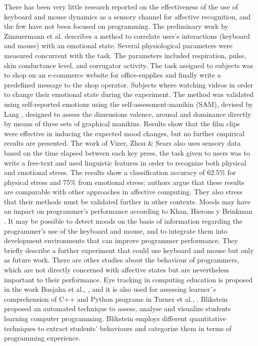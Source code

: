 \documentclass[conference]{IEEEtran}
\begin{document}
There has been very little research reported on the effectiveness of the use of
keyboard and mouse dynamics as a sensory channel for affective recognition, and
the few have not been focused on programming. The preliminary work by Zimmermann
et al. \cite{zimmermann2003affective} describes a method to correlate user’s interactions (keyboard and
mouse) with an emotional state. Several physiological parameters were measured
concurrent with the task. The parameters included respiration, pulse, skin
conductance level, and corrugator activity. The task assigned to subjects was to
shop on an e-commerce website for office-supplies and finally write a predefined
message to the shop operator. Subjects where watching videos in order to change
their emotional state during the experiment. The method was validated using
self-reported emotions using the self-assessment-manikin (SAM), devised by Lang
\cite{lang1980behavioral}, designed to assess the dimensions valence, arousal and dominance
directly by means of three sets of graphical manikins. Results show that the
film clips were effective in inducing the expected mood changes, but no further
empirical results are presented. The work of Vizer, Zhou \& Sears \cite{vizer2009automated} also
uses sensory data based on the time elapsed between each key press, the task
given to users was to write a free-text and used linguistic features in order to
recognize both physical and emotional stress. The results show a classification
accuracy of 62.5\% for physical stress and 75\% from emotional stress; authors
argue that these results are comparable with other approaches in affective
computing. They also stress that their methods must be validated further in
other contexts. Moods may have an impact on programmer’s performance according
to Khan, Hierons y Brinkman \cite{khan2007mood}. It may be possible to detect moods
on the basis of information regarding the programmer’s use of the keyboard and
mouse, and to integrate them into development environments that can improve
programmer performance. They briefly describe a further experiment that could
use keyboard and mouse but only as future work. There are other studies about
the behaviour of programmers, which are not directly concerned with affective
states but are nevertheless important to their performance. Eye tracking in
computing education is proposed in the work Busjahn et al., \cite{busjahn2014eye}, and it is
also used for assessing learner´s comprehension of C++ and Python programs in
Turner et al., \cite{turner2014eye}. Blikstein \cite{blikstein2011using} proposed 
an automated technique to
assess, analyse and visualize students learning computer programming. Blikstein
employs different quantitative techniques to extract students’ behaviours and
categorize them in terms of programming experience.
\end{document}
